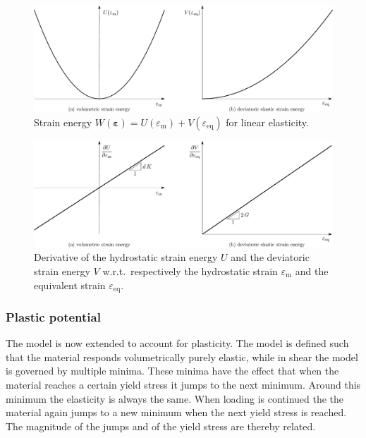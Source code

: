 \documentclass[times,namecite]{goose-article}
\begin{document}
\begin{figure}[htp]
  \centering
  \includegraphics[width=1.\textwidth]{figures/potential_U-V_elas}
  \caption{Strain energy $W ( \bm{\varepsilon} ) = U ( \varepsilon_\mathrm{m} ) + V ( \varepsilon_\mathrm{eq} )$ for linear elasticity.}
  \label{fig:U-V:elas}
\end{figure}

\begin{figure}[htp]
  \centering
  \includegraphics[width=1.\textwidth]{figures/potential_dU-dV_elas}
  \caption{Derivative of the hydrostatic strain energy $U$ and the deviatoric strain energy $V$ w.r.t.\ respectively the hydrostatic strain $\varepsilon_\mathrm{m}$ and the equivalent strain $\varepsilon_\mathrm{eq}$.}
  \label{fig:dU-dV:elas}
\end{figure}

\subsubsection{Plastic potential}

The model is now extended to account for plasticity. The model is defined such that the material responds volumetrically purely elastic, while in shear the model is governed by multiple minima. These minima have the effect that when the material reaches a certain yield stress it jumps to the next minimum. Around this minimum the elasticity is always the same. When loading is continued the the material again jumps to a new minimum when the next yield stress is reached. The magnitude of the jumps and of the yield stress are thereby related.
\end{document}
